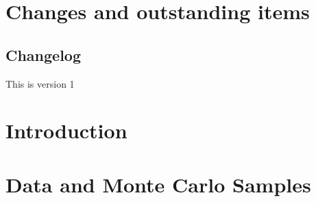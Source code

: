 \documentclass[NOTE, atlasdraft=true, texlive=2016, UKenglish]{\ATLASLATEXPATH atlasdoc}
\begin{document}
\maketitle

\begin{singlespace}
\tableofcontents
\end{singlespace}

\clearpage

\section{Changes and outstanding items}
\label{sec:changes}

\subsection{Changelog}

This is version 1

\clearpage

\section{Introduction}
\label{sec:intro}


%

\section{Data and Monte Carlo Samples}
\label{sec:dataMC}

\end{document}
